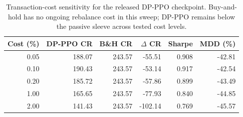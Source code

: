 \begin{table}[htbp]
\centering
\caption{Transaction-cost sensitivity for the released DP-PPO checkpoint. Buy-and-hold has no ongoing rebalance cost in this sweep; DP-PPO remains below the passive sleeve across tested cost levels.}
\label{tab:txcost}
\begin{tabular}{rrrrrr}
\toprule
\textbf{Cost (\%)} & \textbf{DP-PPO CR} & \textbf{B\&H CR} & \textbf{$\Delta$ CR} & \textbf{Sharpe} & \textbf{MDD (\%)} \\
\midrule
0.05 & 188.07 & 243.57 & -55.51 & 0.908 & -42.81 \\
0.10 & 190.43 & 243.57 & -53.14 & 0.917 & -42.54 \\
0.20 & 185.72 & 243.57 & -57.86 & 0.899 & -43.49 \\
1.00 & 165.65 & 243.57 & -77.93 & 0.840 & -44.85 \\
2.00 & 141.43 & 243.57 & -102.14 & 0.769 & -45.57 \\
\bottomrule
\end{tabular}
\end{table}
